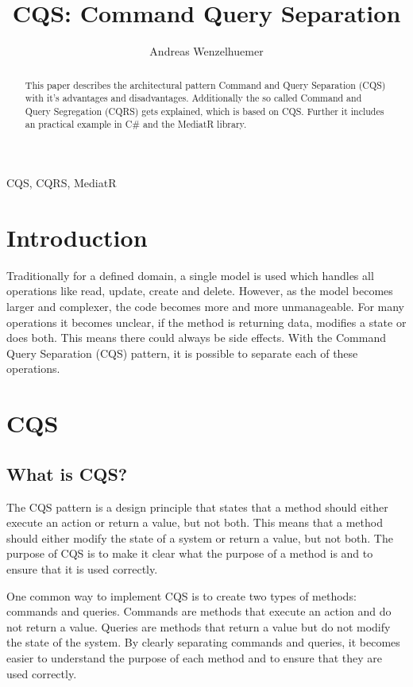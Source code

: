 \documentclass[11pt,conference]{IEEEtran}
\author{Andreas Wenzelhuemer}
\begin{document}
\title{CQS: Command Query Separation}

\thispagestyle{plain}
\pagestyle{plain}
\maketitle

\begin{abstract}
This paper describes the architectural pattern Command and Query Separation (CQS) with it's advantages and disadvantages.
Additionally the so called Command and Query Segregation (CQRS) gets explained, which is based on CQS.
Further it includes an practical example in C\# and the MediatR library. 
\end{abstract}

\begin{IEEEkeywords}
CQS, CQRS, MediatR
\end{IEEEkeywords}

\section{Introduction}

Traditionally for a defined domain, a single model is used which handles all operations like read, update, create and delete.
However, as the model becomes larger and complexer, the code becomes more and more unmanageable.
For many operations it becomes unclear, if the method is returning data, modifies a state or does both.
This means there could always be side effects.
With the Command Query Separation (CQS) pattern, it is possible to separate each of these operations.

\section{CQS}

\subsection{What is CQS?}

The CQS pattern is a design principle that states that a method should either execute an action or return a value, but not both. This means that a method should either modify the state of a system or return a value, but not both. The purpose of CQS is to make it clear what the purpose of a method is and to ensure that it is used correctly.

One common way to implement CQS is to create two types of methods: commands and queries. Commands are methods that execute an action and do not return a value. Queries are methods that return a value but do not modify the state of the system. By clearly separating commands and queries, it becomes easier to understand the purpose of each method and to ensure that they are used correctly.
\end{document}
